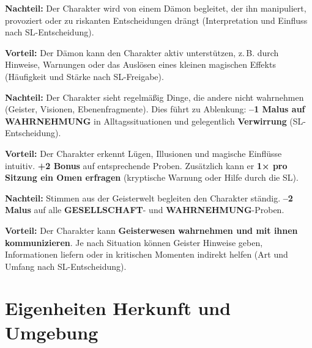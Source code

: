 \begin{traitbox}{}
	
	\textbf{Nachteil:}  
	Der Charakter wird von einem Dämon begleitet,
	der ihn manipuliert, provoziert oder zu riskanten Entscheidungen drängt
	(Interpretation und Einfluss nach SL-Entscheidung).
	
	\medskip
	\textbf{Vorteil:}  
	Der Dämon kann den Charakter aktiv unterstützen,
	z.\,B. durch Hinweise, Warnungen oder das Auslösen eines
	kleinen magischen Effekts (Häufigkeit und Stärke nach SL-Freigabe).
	
\end{traitbox}

\begin{traitbox}{}
	
	\textbf{Nachteil:}  
	Der Charakter sieht regelmäßig Dinge, die andere nicht wahrnehmen
	(Geister, Visionen, Ebenenfragmente).
	Dies führt zu Ablenkung:
	\textbf{–1 Malus auf WAHRNEHMUNG} in Alltagssituationen
	und gelegentlich \textbf{Verwirrung} (SL-Entscheidung).
	
	\medskip
	\textbf{Vorteil:}  
	Der Charakter erkennt Lügen, Illusionen und magische Einflüsse intuitiv.
	\textbf{+2 Bonus} auf entsprechende Proben.
	Zusätzlich kann er \textbf{1× pro Sitzung ein Omen erfragen}
	(kryptische Warnung oder Hilfe durch die SL).
	
\end{traitbox}

\begin{traitbox}{}
	
	\textbf{Nachteil:}  
	Stimmen aus der Geisterwelt begleiten den Charakter ständig.
	\textbf{–2 Malus} auf alle \textbf{GESELLSCHAFT}- und \textbf{WAHRNEHMUNG}-Proben.
	
	\medskip
	\textbf{Vorteil:}  
	Der Charakter kann \textbf{Geisterwesen wahrnehmen und mit ihnen kommunizieren}.
	Je nach Situation können Geister Hinweise geben,
	Informationen liefern oder in kritischen Momenten indirekt helfen
	(Art und Umfang nach SL-Entscheidung).
	
\end{traitbox}

\section{Eigenheiten Herkunft und Umgebung}

